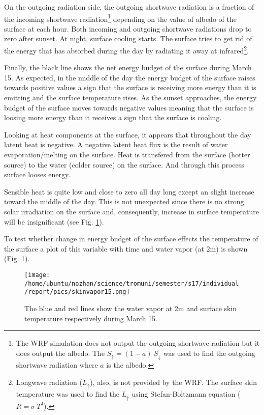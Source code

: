 \documentclass[a4paper,12pt]{article}
\numberwithin{equation}{section} %
\begin{document}
On the outgoing radiation side, the outgoing shortwave radiation is a fraction of the incoming shortwave radiation\footnote{The WRF simulation does not output the outgoing shortwave radiation but it does output the albedo. The $S_{\uparrow} = (1 - a)\: S_{\downarrow}$ was used to find the outgoing shortwave radiation where $a$ is the albedo.} depending on the value of albedo of the surface at each hour. Both incoming and outgoing shortwave radiations drop to zero after sunset. At night, surface cooling starts. The surface tries to get rid of the energy that has absorbed during the day by radiating it away at infrared\footnote{Longwave radiation ($L_{\uparrow}$), also, is not provided by the WRF. The surface skin temperature was used to find the $L_{\uparrow}$ using Stefan-Boltzmann equation ($R = \sigma \: T^4$).}. 

Finally, the black line shows the net energy budget of the surface during March 15. As expected, in the middle of the day the energy budget of the surface raises towards positive values a sign that the surface is receiving more energy than it is emitting and the surface temperature rises. As the sunset approaches, the energy budget of the surface moves towards negative values meaning that the surface is loosing more energy than it receives a sign that the surface is cooling.

Looking at heat components at the surface, it appears that throughout the day latent heat is negative. A negative latent heat flux is the result of water evaporation/melting on the surface. Heat is transfered from the surface (hotter source) to the water (colder source) on the surface. And through this process surface looses energy. 

Sensible heat is quite low and close to zero all day long except an slight increase toward the middle of the day. This is not unexpected since there is no strong solar irradiation on the surface and, consequently, increase in surface temperature will be insignificant (see Fig. \ref{skinvapor15}).

To test whether change in energy budget of the surface effects the temperature of the surface a plot of this variable with time and water vapor (at 2m) is shown (Fig. \ref{skinvapor15}). 

\vspace{1cm}

\begin{figure}[bhp]
\texttt{[image: /home/ubuntu/nozhan/science/tromuni/semester/s17/individual/report/pics/skinvapor15.png]}
\caption{The blue and red lines show the water vapor at 2m and surface skin temperature respectively during March 15.}
\label{skinvapor15}
\end{figure}
\end{document}
